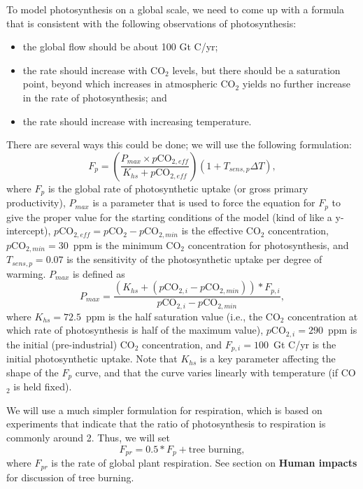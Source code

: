 \documentclass[11pt,letterpaper]{article}
\begin{document}
To model photosynthesis on a global scale, we need to come up with a formula that is consistent with the following observations of photosynthesis:
\begin{itemize}
\item the global flow should be about 100 Gt C/yr;
\item the rate should increase with CO$_2$ levels, but there should be a saturation point, beyond which increases in atmospheric CO$_2$ yields no further increase in the rate of photosynthesis; and
\item the rate should increase with increasing temperature.
\end{itemize}
There are several ways this could be done; we will use the following formulation:
\begin{equation}
F_p = \left(\frac{P_{max}\times p\mbox{CO}_{2,eff}}{K_{hs}+p\mbox{CO}_{2,eff}}\right)\left(1+T_{sens,p}\Delta T\right),
\end{equation}
where $F_p$ is the global rate of photosynthetic uptake (or gross primary productivity), $P_{max}$ is a parameter that is used to force the equation for $F_p$ to give the proper value for the starting conditions of the model (kind of like a y-intercept), $p\mbox{CO}_{2,eff}=p\mbox{CO}_{2}-p\mbox{CO}_{2,min}$ is the effective CO$_2$ concentration, $p\mbox{CO}_{2,min}=30$~ppm is the minimum CO$_2$ concentration for photosynthesis, and $T_{sens,p}=0.07$ is the sensitivity of the photosynthetic uptake per degree of warming. $P_{max}$ is defined as
\begin{equation}
P_{max} = \frac{(K_{hs}+(p\mbox{CO}_{2,i}-p\mbox{CO}_{2,min}))*F_{p,i}}{p\mbox{CO}_{2,i}-p\mbox{CO}_{2,min}},
\end{equation}
where $K_{hs}=72.5$~ppm is the half saturation value (i.e., the CO$_2$ concentration at which rate of photosynthesis is half of the maximum value), $p\mbox{CO}_{2,i}=290$~ppm is the initial (pre-industrial) CO$_2$ concentration, and $F_{p,i}=100$~Gt C/yr is the initial photosynthetic uptake. Note that $K_{hs}$ is a key parameter affecting the shape of the $F_p$ curve, and that the curve varies linearly with temperature (if CO$_2$ is held fixed).

We will use a much simpler formulation for respiration, which is based on experiments that indicate that the ratio of photosynthesis to respiration is commonly around 2. Thus, we will set
\begin{equation}
F_{pr}=0.5*F_p+\mbox{tree burning},
\end{equation}
where $F_{pr}$ is the rate of global plant respiration. See section on \textbf{Human impacts} for discussion of tree burning.
\end{document}
